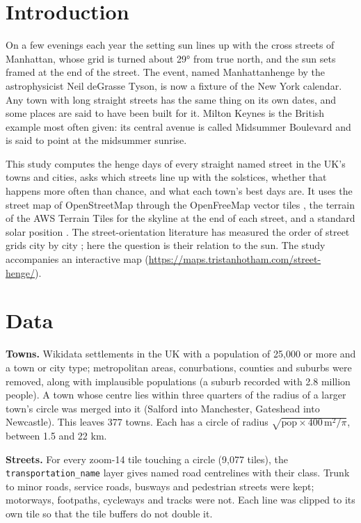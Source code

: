 \documentclass[11pt,a4paper]{article}
\begin{document}
\section{Introduction}
On a few evenings each year the setting sun lines up with the cross streets of Manhattan, whose grid is turned about 29° from true north, and the sun sets framed at the end of the street. The event, named Manhattanhenge by the astrophysicist Neil deGrasse Tyson, is now a fixture of the New York calendar. Any town with long straight streets has the same thing on its own dates, and some places are said to have been built for it. Milton Keynes is the British example most often given: its central avenue is called Midsummer Boulevard and is said to point at the midsummer sunrise.

This study computes the henge days of every straight named street in the UK's towns and cities, asks which streets line up with the solstices, whether that happens more often than chance, and what each town's best days are. It uses the street map of OpenStreetMap \citep{osm} through the OpenFreeMap vector tiles \citep{ofm}, the terrain of the AWS Terrain Tiles \citep{terrain} for the skyline at the end of each street, and a standard solar position \citep{spencer,bennett}. The street-orientation literature has measured the order of street grids city by city \citep{boeing}; here the question is their relation to the sun. The study accompanies an interactive map (\url{https://maps.tristanhotham.com/street-henge/}).

\section{Data}
\textbf{Towns.} Wikidata \citep{wikidata} settlements in the UK with a population of 25,000 or more and a town or city type; metropolitan areas, conurbations, counties and suburbs were removed, along with implausible populations (a suburb recorded with 2.8 million people). A town whose centre lies within three quarters of the radius of a larger town's circle was merged into it (Salford into Manchester, Gateshead into Newcastle). This leaves 377 towns. Each has a circle of radius $\sqrt{\mathrm{pop} \times 400\,\mathrm{m}^2/\pi}$, between 1.5 and 22 km.

\textbf{Streets.} For every zoom-14 tile touching a circle (9,077 tiles), the \texttt{transportation\_name} layer gives named road centrelines with their class. Trunk to minor roads, service roads, busways and pedestrian streets were kept; motorways, footpaths, cycleways and tracks were not. Each line was clipped to its own tile so that the tile buffers do not double it.
\end{document}
